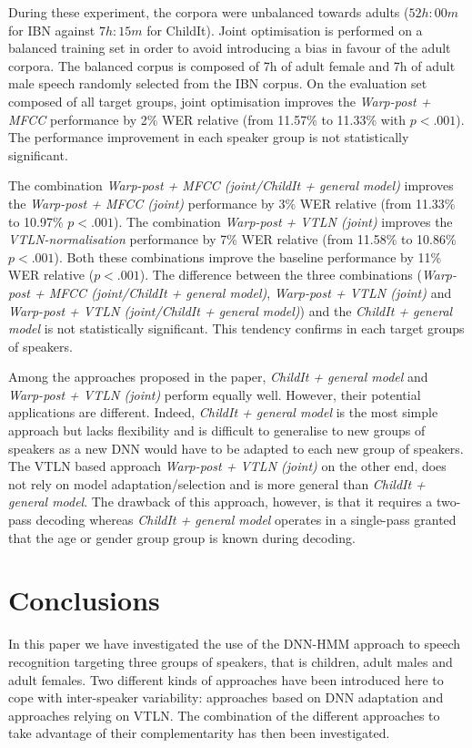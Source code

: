 \documentclass{nle}
\begin{document}
During these experiment, the corpora were unbalanced towards adults ($52h:00m$ for IBN against $7h:15m$ for ChildIt). Joint optimisation is performed on a balanced training set in order to avoid introducing a bias in favour of the adult corpora. The balanced corpus is composed of 7h of adult female and 7h of adult male speech randomly selected from the IBN corpus. On the evaluation set composed of all target groups, joint optimisation improves the {\em Warp-post + MFCC} performance by 2\% WER relative (from 11.57\% to 11.33\% with $p<.001$). The performance improvement in each speaker group is not statistically significant.

The combination {\em Warp-post + MFCC (joint/ChildIt + general model)} improves the {\em Warp-post + MFCC (joint)} performance by 3\% WER relative (from 11.33\% to 10.97\% $p<.001$). The combination {\em Warp-post + VTLN (joint)} improves the {\em VTLN-normalisation} performance by 7\% WER relative (from 11.58\% to 10.86\% $p<.001$). Both these combinations improve the baseline performance by 11\% WER relative ($p<.001$). The difference between the three combinations ({\em Warp-post + MFCC (joint/ChildIt + general model)}, {\em Warp-post + VTLN (joint)} and {\em Warp-post + VTLN (joint/ChildIt + general model)}) and the {\em ChildIt + general model} is not statistically significant. This tendency confirms in each target groups of speakers.

Among the approaches proposed in the paper, {\em ChildIt + general model} and {\em Warp-post + VTLN (joint)} perform equally well. However, their potential applications are different. Indeed, {\em ChildIt + general model} is the most simple approach but lacks flexibility and is difficult to generalise to new groups of speakers as a new DNN would have to be adapted to each new group of speakers. The VTLN based approach {\em Warp-post + VTLN (joint)} on the other end, does not rely on model adaptation/selection and is more general than {\em ChildIt + general model}. The drawback of this approach, however, is that it requires a two-pass decoding whereas {\em ChildIt + general model} operates in a single-pass granted that the age or gender group group is known during decoding.


\section{Conclusions}\label{section:concl}
In this paper we have investigated  the use of the DNN-HMM approach to
speech  recognition  targeting  three  groups  of  speakers,  that  is
children,  adult  males and  adult  females.  Two  different kinds  of
approaches   have   been  introduced   here   to  cope  with  inter-speaker
variability: approaches based on DNN adaptation and approaches relying
on VTLN. The combination of the different approaches to take advantage
of their complementarity has then been investigated.
\end{document}
